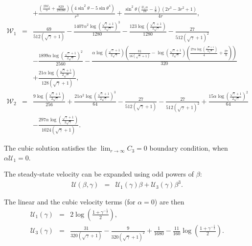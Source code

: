\documentclass[final]{elsarticle}
\newcommand{\pars}[1]{\left(#1\right)}
\newcommand\cU{\mathscr{U}}
\newcommand\cW{\mathscr{W}}
\begin{document}
\begin{eqnarray*}
\\ && + \frac{\left(\frac{2 {\cW_2}}{5} + \frac{829}{28160}\right) \left(4 {\sin^2\theta} - 5 {\sin\theta}^4\right)}{r^3} + \frac{{\sin^2\theta} \left(\frac{{\cU_1}\alpha}{16} - \frac{1}{8}\right) \left(2 r^3 - 3 r^2 + 1\right)}{4 r},
\\
\cW_1 &=& \frac{69}{512 \left(\sqrt{\gamma} + 1\right)} - \frac{1407\alpha^2 {\log\left(\frac{\sqrt{\gamma} + 1}{2 \sqrt{\gamma}}\right)}^3}{1280} - \frac{123 \log\left(\frac{\sqrt{\gamma} + 1}{2 \sqrt{\gamma}}\right)}{1280} - \frac{27}{512 {\left(\sqrt{\gamma} + 1\right)}^2} \\ && -
\frac{1899\alpha {\log\left(\frac{\sqrt{\gamma} + 1}{2 \sqrt{\gamma}}\right)}^2}{2560} - \frac{\alpha \log\left(\frac{\sqrt{\gamma} + 1}{2 \sqrt{\gamma}}\right) \left(\frac{81}{16 \left(\sqrt{\gamma} + 1\right)} - \log\left(\frac{\sqrt{\gamma} + 1}{2 \sqrt{\gamma}}\right) \left(\frac{27\alpha \log\left(\frac{\sqrt{\gamma} + 1}{2 \sqrt{\gamma}}\right)}{4} + \frac{27}{8}\right)\right)}{320} \\ && + 
\frac{21\alpha \log\left(\frac{\sqrt{\gamma} + 1}{2 \sqrt{\gamma}}\right)}{128 \left(\sqrt{\gamma} + 1\right)},
\\
\cW_2 &=& \frac{9 \log\left(\frac{\sqrt{\gamma} + 1}{2 \sqrt{\gamma}}\right)}{256} + \frac{21\alpha^2 {\log\left(\frac{\sqrt{\gamma} + 1}{2 \sqrt{\gamma}}\right)}^3}{64} - \frac{27}{512 \left(\sqrt{\gamma} + 1\right)} - \frac{27}{512 {\left(\sqrt{\gamma} + 1\right)}^2}
 + \frac{15\alpha {\log\left(\frac{\sqrt{\gamma} + 1}{2 \sqrt{\gamma}}\right)}^2}{64} 
\\ && 
- \frac{297\alpha \log\left(\frac{\sqrt{\gamma} + 1}{2 \sqrt{\gamma}}\right)}{1024 \left(\sqrt{\gamma} + 1\right)}.
\end{eqnarray*}

The cubic solution satisfies the $\lim_{r\rightarrow\infty}C_3 = 0$ boundary condition, 
when $\alpha\cU_1 = 0$.

The steady-state velocity can be expanded using odd powers of $\beta$:
\begin{eqnarray*}
\cU(\beta, \gamma) &=& \cU_1(\gamma) \beta + \cU_3(\gamma) \beta^3.
\end{eqnarray*}

The linear and the cubic velocity terms (for $\alpha = 0$) are then
\begin{eqnarray*}
\cU_1(\gamma) &=& 2 \log \pars{\frac{1 + \gamma^{-\frac{1}{2}}}{2}}, \\
\cU_3(\gamma) &=& \frac{31}{320(\sqrt\gamma + 1)} - \frac{9}{320(\sqrt\gamma + 1)^2} + \frac{1}{1680} - \frac{11}{160} \log \pars{\frac{1 + \gamma^{-\frac{1}{2}}}{2}}.
\end{eqnarray*}
\end{document}
